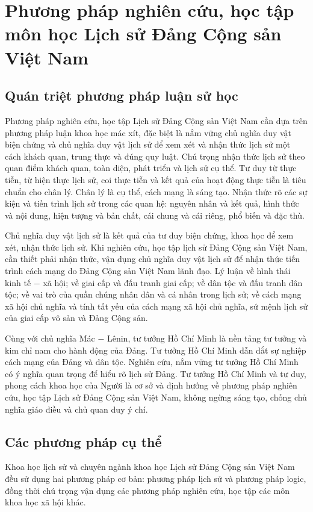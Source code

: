 \section{Phương pháp nghiên cứu, học tập môn học Lịch sử Đảng Cộng sản Việt Nam}
\subsection{Quán triệt phương pháp luận sử học}
Phương pháp nghiên cứu, học tập Lịch sử Đảng Cộng sản Việt Nam cần dựa trên phương pháp luận khoa học mác xít, đặc biệt là nắm vững chủ nghĩa duy vật biện chứng và chủ nghĩa duy vật lịch sử để xem xét và nhận thức lịch sử một cách khách quan, trung thực và đúng quy luật. Chú trọng nhận thức lịch sử theo quan điểm khách quan, toàn diện, phát triển và lịch sử cụ thể. Tư duy từ thực tiễn, từ hiện thực lịch sử, coi thực tiễn và kết quả của hoạt động thực tiễn là tiêu chuẩn cho chân lý. Chân lý là cụ thể, cách mạng là sáng tạo. Nhận thức rõ các sự kiện và tiến trình lịch sử trong các quan hệ: nguyên nhân và kết quả, hình thức và nội dung, hiện tượng và bản chất, cái chung và cái riêng, phổ biến và đặc thù.

Chủ nghĩa duy vật lịch sử là kết quả của tư duy biện chứng, khoa học để xem xét, nhận thức lịch sử. Khi nghiên cứu, học tập lịch sử Đảng Cộng sản Việt Nam, cần thiết phải nhận thức, vận dụng chủ nghĩa duy vật lịch sử để nhận thức tiến trình cách mạng do Đảng Cộng sản Việt Nam lãnh đạo. Lý luận về hình thái kinh tế $-$ xã hội; về giai cấp và đấu tranh giai cấp; về dân tộc và đấu tranh dân tộc; về vai trò của quần chúng nhân dân và cá nhân trong lịch sử; về cách mạng xã hội chủ nghĩa và tính tất yếu của cách mạng xã hội chủ nghĩa, sứ mệnh lịch sử của giai cấp vô sản và Đảng Cộng sản.

Cùng với chủ nghĩa Mác $-$ Lênin, tư tưởng Hồ Chí Minh là nền tảng tư tưởng và kim chỉ nam cho hành động của Đảng. Tư tưởng Hồ Chí Minh dẫn dắt sự nghiệp cách mạng của Đảng và dân tộc. Nghiên cứu, nắm vững tư tưởng Hồ Chí Minh có ý nghĩa quan trọng để hiểu rõ lịch sử Đảng. Tư tưởng Hồ Chí Minh và tư duy, phong cách khoa học của Người là cơ sở và định hướng về phương pháp nghiên cứu, học tập Lịch sử Đảng Cộng sản Việt Nam, không ngừng sáng tạo, chống chủ nghĩa giáo điều và chủ quan duy ý chí.

\subsection{Các phương pháp cụ thể}
Khoa học lịch sử và chuyên ngành khoa học Lịch sử Đảng Cộng sản Việt Nam đều sử dụng hai phương pháp cơ bản: phương pháp lịch sử và phương pháp logic, đồng thời chú trọng vận dụng các phương pháp nghiên cứu, học tập các môn khoa học xã hội khác.
